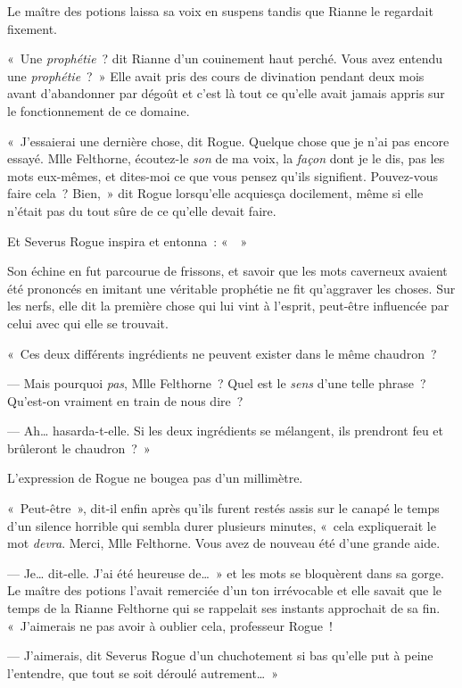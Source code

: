 Le maître des potions laissa sa voix en suspens tandis que Rianne le regardait fixement.

«~Une \emph{prophétie}~? dit Rianne d'un couinement haut perché. Vous avez entendu une \emph{prophétie}~?~» Elle avait pris des cours de divination pendant deux mois avant d'abandonner par dégoût et c'est là tout ce qu'elle avait jamais appris sur le fonctionnement de ce domaine.

«~J'essaierai une dernière chose, dit Rogue. Quelque chose que je n'ai pas encore essayé. Mlle Felthorne, écoutez-le \emph{son} de ma voix, la \emph{façon} dont je le dis, pas les mots eux-mêmes, et dites-moi ce que vous pensez qu'ils signifient. Pouvez-vous faire cela~? Bien,~» dit Rogue lorsqu'elle acquiesça docilement, même si elle n'était pas du tout sûre de ce qu'elle devait faire.

Et Severus Rogue inspira et entonna~: «~~»

Son échine en fut parcourue de frissons, et savoir que les mots caverneux avaient été prononcés en imitant une véritable prophétie ne fit qu'aggraver les choses. Sur les nerfs, elle dit la première chose qui lui vint à l'esprit, peut-être influencée par celui avec qui elle se trouvait.

«~Ces deux différents ingrédients ne peuvent exister dans le même chaudron~?

--- Mais pourquoi \emph{pas}, Mlle Felthorne~? Quel est le \emph{sens} d'une telle phrase~? Qu'est-on vraiment en train de nous dire~?

--- Ah… hasarda-t-elle. Si les deux ingrédients se mélangent, ils prendront feu et brûleront le chaudron~?~»

L'expression de Rogue ne bougea pas d'un millimètre.

«~Peut-être~», dit-il enfin après qu'ils furent restés assis sur le canapé le temps d'un silence horrible qui sembla durer plusieurs minutes, «~cela expliquerait le mot \emph{devra}. Merci, Mlle Felthorne. Vous avez de nouveau été d'une grande aide.

--- Je… dit-elle. J'ai été heureuse de…~» et les mots se bloquèrent dans sa gorge. Le maître des potions l'avait remerciée d'un ton irrévocable et elle savait que le temps de la Rianne Felthorne qui se rappelait ses instants approchait de sa fin. «~J'aimerais ne pas avoir à oublier cela, professeur Rogue~!

--- J'aimerais, dit Severus Rogue d'un chuchotement si bas qu'elle put à peine l'entendre, que tout se soit déroulé autrement…~»

